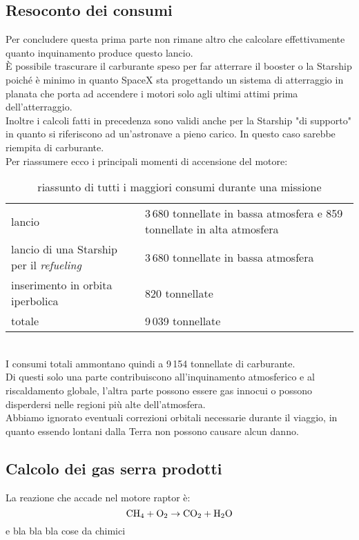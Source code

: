 \subsection{Resoconto dei consumi}
Per concludere questa prima parte non rimane altro che calcolare effettivamente quanto inquinamento produce questo lancio.\\
È possibile trascurare il carburante speso per far atterrare il booster o la Starship poiché è minimo in quanto SpaceX sta progettando un sistema di atterraggio in planata che porta ad accendere i motori solo agli ultimi attimi prima dell'atterraggio.\\
Inoltre i calcoli fatti in precedenza sono validi anche per la Starship "di supporto" in quanto si riferiscono ad un'astronave a pieno carico. In questo caso sarebbe riempita di carburante.\\
Per riassumere ecco i principali momenti di accensione del motore:\\
\begin{table}[h!]
\centering
\label{tablella consumi}

\begin{tabular}{|l|l|}
    \hline
    lancio & 3\,680 tonnellate in bassa atmosfera e 859 tonnellate in alta atmosfera  \\
    lancio di una Starship per il \textit{refueling} & 3\,680 tonnellate in bassa atmosfera  \\
    inserimento in orbita iperbolica & 820 tonnellate \\
    \hline
    totale & 9\,039 tonnellate \\
    \hline
    
\end{tabular}
\caption{riassunto di tutti i maggiori consumi durante una missione}
\end{table}\\
I consumi totali ammontano quindi a 9\,154 tonnellate di carburante.\\ Di questi solo una parte contribuiscono all'inquinamento atmosferico e al riscaldamento globale, l'altra parte possono essere gas innocui o possono disperdersi nelle regioni più alte dell'atmosfera.\\
Abbiamo ignorato eventuali correzioni orbitali necessarie durante il viaggio, in quanto essendo lontani dalla Terra non possono causare alcun danno.\\
\subsection{Calcolo dei gas serra prodotti}
La reazione che accade nel motore raptor è:
$$
\ce{CH4} + \ce{O2} \rightarrow \ce{CO2} + \ce{H2O}
$$
e bla bla bla cose da chimici
